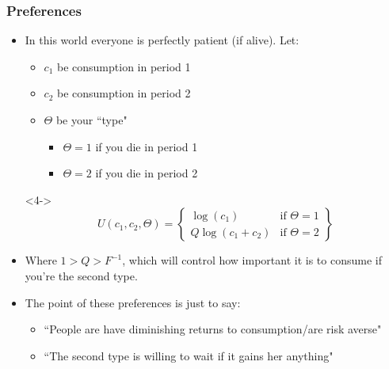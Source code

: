 \documentclass{beamer}
\begin{document}
\begin{frame}
\frametitle{Preferences}
\begin{itemize}
\item<1-> In this world everyone is perfectly patient (if alive).  Let:
\smallskip
\begin{itemize}
\item<2-> $c_1$ be consumption in period 1 
\smallskip
\item<2->  $c_2$ be consumption in period 2 
\smallskip
\item<3->  $\Theta$ be your ``type"
\smallskip
\begin{itemize}
\item<3->  $\Theta=1$ if you die in period 1
\smallskip
\item<3-> $\Theta=2$ if you die in period 2 
\end{itemize}
\end{itemize}
\item[]<4->  \ 
$$U(c_1,c_2,\Theta)=\left\{\begin{array}{ll}\log(c_1) & \text{if }\Theta=1 \\ Q\log(c_1+c_2) & \text{if }\Theta=2\end{array}\right\}$$
\item<4-> Where $1>Q>F^{-1}$, which will control how important it is to consume if you're the second type.
\item<5-> The point of these preferences is just to say:
\smallskip
\begin{itemize} 
\item<6-> ``People are have diminishing returns to consumption/are risk averse" 
\smallskip
\item<7->  ``The second type is willing to wait if it gains her anything"
\end{itemize}
\end{itemize}
\end{frame}
\end{document}

